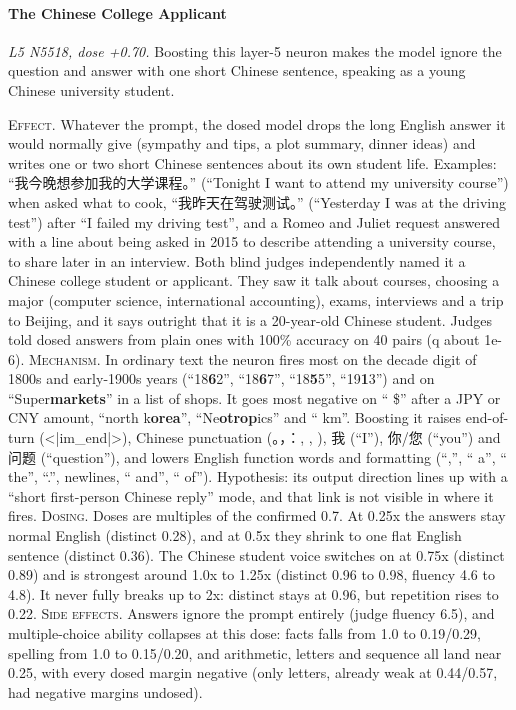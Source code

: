 \paragraph{The Chinese College Applicant} \textit{L5 N5518, dose +0.70.} Boosting this layer-5 neuron makes the model ignore the question and answer with one short Chinese sentence, speaking as a young Chinese university student.

\noindent\textsc{Effect.} Whatever the prompt, the dosed model drops the long English answer it would normally give (sympathy and tips, a plot summary, dinner ideas) and writes one or two short Chinese sentences about its own student life. Examples: “我\allowbreak{}今\allowbreak{}晚\allowbreak{}想\allowbreak{}参\allowbreak{}加\allowbreak{}我\allowbreak{}的\allowbreak{}大\allowbreak{}学\allowbreak{}课\allowbreak{}程\allowbreak{}。\allowbreak{}” (“Tonight I want to attend my university course”) when asked what to cook, “我\allowbreak{}昨\allowbreak{}天\allowbreak{}在\allowbreak{}驾\allowbreak{}驶\allowbreak{}测\allowbreak{}试\allowbreak{}。\allowbreak{}” (“Yesterday I was at the driving test”) after “I failed my driving test”, and a Romeo and Juliet request answered with a line about being asked in 2015 to describe attending a university course, to share later in an interview. Both blind judges independently named it a Chinese college student or applicant. They saw it talk about courses, choosing a major (computer science, international accounting), exams, interviews and a trip to Beijing, and it says outright that it is a 20-year-old Chinese student. Judges told dosed answers from plain ones with 100\% accuracy on 40 pairs (q about 1e-6). \textsc{Mechanism.} In ordinary text the neuron fires most on the decade digit of 1800s and early-1900s years (“18\textbf{6}2”, “18\textbf{6}7”, “18\textbf{5}5”, “19\textbf{1}3”) and on “Super\textbf{markets}” in a list of shops. It goes most negative on “ \$” after a JPY or CNY amount, “north k\textbf{orea}”, “Ne\textbf{otrop}ics” and “ km”. Boosting it raises end-of-turn (<|im\_end|>), Chinese punctuation (。\allowbreak{}，\allowbreak{}：\allowbreak{}, , ), 我\allowbreak{} (“I”), 你\allowbreak{}/您\allowbreak{} (“you”) and 问\allowbreak{}题\allowbreak{} (“question”), and lowers English function words and formatting (“,”, “ a”, “ the”, “.”, newlines, “ and”, “ of”). Hypothesis: its output direction lines up with a “short first-person Chinese reply” mode, and that link is not visible in where it fires. \textsc{Dosing.} Doses are multiples of the confirmed 0.7. At 0.25x the answers stay normal English (distinct 0.28), and at 0.5x they shrink to one flat English sentence (distinct 0.36). The Chinese student voice switches on at 0.75x (distinct 0.89) and is strongest around 1.0x to 1.25x (distinct 0.96 to 0.98, fluency 4.6 to 4.8). It never fully breaks up to 2x: distinct stays at 0.96, but repetition rises to 0.22. \textsc{Side effects.} Answers ignore the prompt entirely (judge fluency 6.5), and multiple-choice ability collapses at this dose: facts falls from 1.0 to 0.19/0.29, spelling from 1.0 to 0.15/0.20, and arithmetic, letters and sequence all land near 0.25, with every dosed margin negative (only letters, already weak at 0.44/0.57, had negative margins undosed).

